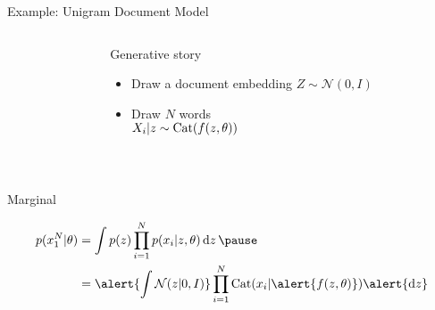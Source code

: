 \documentclass[14pt]{beamer}
\begin{document}
\begin{frame}{Example: Unigram Document Model}


\begin{columns}
	\begin{column}{0.2\textwidth}
    \end{column}
    \begin{column}{0.75\textwidth}
    	Generative story 
    	\begin{itemize}
			\item Draw a document embedding $Z \sim \mathcal N(0, I)$
			\item Draw $N$ words\\
			$X_i|z \sim \operatorname{Cat}(f(z, \theta))$
		\end{itemize}
    \end{column}
    \end{columns}
    
    
    ~
    
	Marginal \pause
	\begin{small}
    \begin{equation*}
	\begin{aligned}						
		p(x_1^N|\theta) &= \int p(z) \prod_{i=1}^N p(x_i|z, \theta) \dd{z} \pause \\
		&= \alert{\int \mathcal N(z|0, I)} \prod_{i=1}^N \Cat(x_i|\alert{f(z, \theta)}) \alert{\dd{z}}
	\end{aligned}
	\end{equation*}
	\end{small}

\end{frame}
\end{document}
